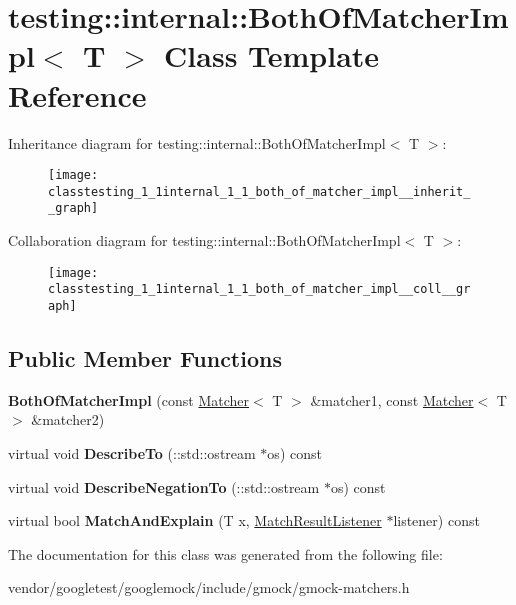 \hypertarget{classtesting_1_1internal_1_1_both_of_matcher_impl}{}\section{testing\+:\+:internal\+:\+:Both\+Of\+Matcher\+Impl$<$ T $>$ Class Template Reference}
\label{classtesting_1_1internal_1_1_both_of_matcher_impl}


Inheritance diagram for testing\+:\+:internal\+:\+:Both\+Of\+Matcher\+Impl$<$ T $>$\+:
\nopagebreak
\begin{figure}[H]
\begin{center}
\leavevmode
\texttt{[image: classtesting\_1\_1internal\_1\_1\_both\_of\_matcher\_impl\_\_inherit\_\_graph]}
\end{center}
\end{figure}


Collaboration diagram for testing\+:\+:internal\+:\+:Both\+Of\+Matcher\+Impl$<$ T $>$\+:
\nopagebreak
\begin{figure}[H]
\begin{center}
\leavevmode
\texttt{[image: classtesting\_1\_1internal\_1\_1\_both\_of\_matcher\_impl\_\_coll\_\_graph]}
\end{center}
\end{figure}
\subsection*{Public Member Functions}
\begin{DoxyCompactItemize}
\item 
\mbox{\label{classtesting_1_1internal_1_1_both_of_matcher_impl_a41760fcb35ba18ac2a0eb580ac61ea9a}} 
{\bfseries Both\+Of\+Matcher\+Impl} (const \hyperlink{classtesting_1_1_matcher}{Matcher}$<$ T $>$ \&matcher1, const \hyperlink{classtesting_1_1_matcher}{Matcher}$<$ T $>$ \&matcher2)
\item 
\mbox{\label{classtesting_1_1internal_1_1_both_of_matcher_impl_a3a1f92f7b093d36ab38c35fbcae4ce4d}} 
virtual void {\bfseries Describe\+To} (\+::std\+::ostream $\ast$os) const
\item 
\mbox{\label{classtesting_1_1internal_1_1_both_of_matcher_impl_a4f6017c7aca6e5c8166ff4c613d8dbec}} 
virtual void {\bfseries Describe\+Negation\+To} (\+::std\+::ostream $\ast$os) const
\item 
\mbox{\label{classtesting_1_1internal_1_1_both_of_matcher_impl_a4f3e5edf69d168fef8bec577313748f4}} 
virtual bool {\bfseries Match\+And\+Explain} (T x, \hyperlink{classtesting_1_1_match_result_listener}{Match\+Result\+Listener} $\ast$listener) const
\end{DoxyCompactItemize}


The documentation for this class was generated from the following file\+:\begin{DoxyCompactItemize}
\item 
vendor/googletest/googlemock/include/gmock/gmock-\/matchers.\+h\end{DoxyCompactItemize}
